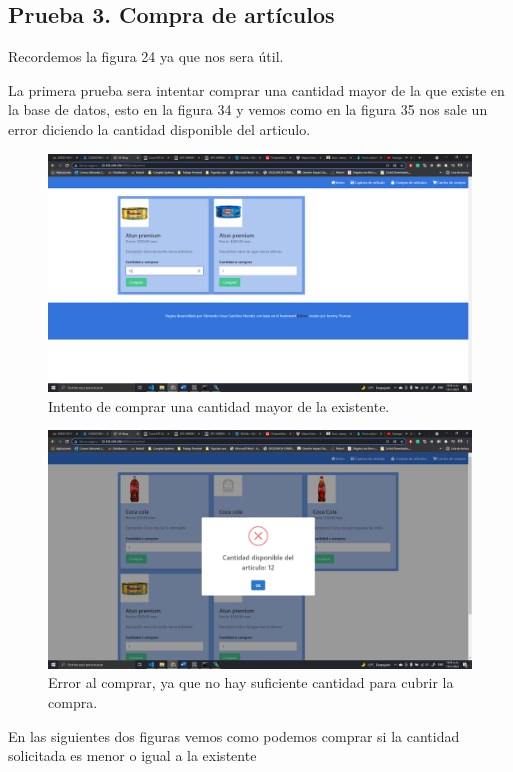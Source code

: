 \documentclass[11pt]{article}
\begin{document}
		\subsection{Prueba 3. Compra de artículos}
		Recordemos la figura 24 ya que nos sera útil.\par
		La primera prueba sera intentar comprar una cantidad mayor de la que existe en la base de datos, esto en la figura 34 y vemos como en la figura 35 nos sale un error diciendo la cantidad disponible del articulo.
		\begin{figure}[H]
			\centering
			\includegraphics[scale=0.34]{resources/p3.1.png}
			\caption{Intento de comprar una cantidad mayor de la existente.}\label{fig:picture}
		\end{figure}
		\begin{figure}[H]
			\centering
			\includegraphics[scale=0.34]{resources/p3.2.png}
			\caption{Error al comprar, ya que no hay suficiente cantidad para cubrir la compra.}\label{fig:picture}
		\end{figure}
		En las siguientes dos figuras vemos como podemos comprar si la cantidad solicitada es menor o igual a la existente
\end{document}
